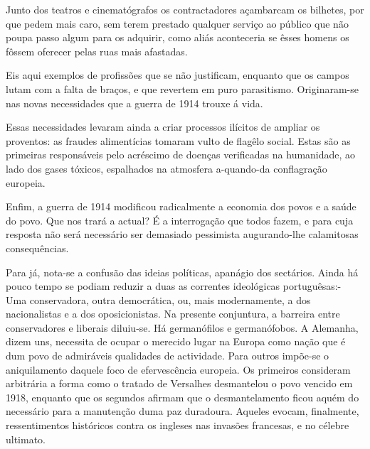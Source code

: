 \documentclass[9pt]{article}
\begin{document}
Junto dos teatros e cinematógrafos os contractadores açambarcam os
bi\-lhetes, por que pedem mais caro, sem terem prestado qualquer serviço ao
público que não poupa passo algum para os adquirir, como aliás aconteceria
se êsses homens os fôssem oferecer pelas ruas mais afastadas.

Eis aqui exemplos de profissões que se não justifi\-cam, enquanto que os
campos lutam com a falta de braços, e que revertem em puro parasitismo. Originaram-se nas novas necessidades que a guerra de 1914 trouxe á vida.

Essas necessidades levaram ainda a criar processos ilícitos de ampliar
os proventos: as fraudes alimentícias tomaram vulto de flagêlo social. Estas
são as primeiras responsáveis pelo acréscimo de doenças verifi\-cadas na
humanidade, ao lado dos gases tóxicos, espa\-lhados na atmosfera
a-quan\-do-da conflagra\-ção europeia.

Enfim, a guerra de 1914 modificou radicalmente a economia dos povos e
a saúde do povo. Que nos trará a actual? É a interroga\-ção que todos fazem,
e para cuja resposta não será necessário ser demasiado pessimista augurando-\-lhe calamitosas consequências.

Para já, nota-se a confusão das ideias políticas, apanágio dos se\-ctá\-rios. Ainda há pouco tempo se podiam reduzir a duas as correntes ideológicas  por\-tu\-guêsas:- Uma conservadora, outra democrática, ou, mais modernamente,
a dos na\-cio\-nalistas e a dos oposicionistas. Na presente conjuntura, a barreira entre conservadores e liberais di\-lu\-\mbox{iu-se}. Há germanófilos e germanófobos.
A Alemanha, dizem uns, necessita de ocupar o merecido lugar na Europa como
na\-ção que é dum povo de admiráveis qualidades de actividade. Para outros
impõe-se o aniquilamento daquele foco de efervescência europeia. Os primeiros consideram arbitrária a forma como o tratado de Versa\-lhes desmantelou
o povo vencido em 1918, enquanto que os segundos afirmam que o desmantelamento ficou aquém do necessário para a manuten\-ção duma paz duradoura.
Aqueles evocam, finalmente, ressentimentos históricos contra os ingleses nas invasões francesas, e no célebre ultimato.
\end{document}
